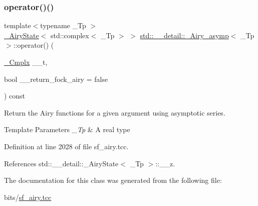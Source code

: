 \subsubsection{\texorpdfstring{operator()()}{operator()()}}
{\footnotesize\ttfamily template$<$typename \+\_\+\+Tp $>$ \\
\hyperlink{structstd_1_1____detail_1_1__AiryState}{\+\_\+\+Airy\+State}$<$ std\+::complex$<$ \+\_\+\+Tp $>$ $>$ \hyperlink{classstd_1_1____detail_1_1__Airy__asymp}{std\+::\+\_\+\+\_\+detail\+::\+\_\+\+Airy\+\_\+asymp}$<$ \+\_\+\+Tp $>$\+::operator() (\begin{DoxyParamCaption}\item[{\hyperlink{classstd_1_1____detail_1_1__Airy__asymp_ae28f102423d34e78502ab6da42d67f50}{\+\_\+\+Cmplx}}]{\+\_\+\+\_\+t,  }\item[{bool}]{\+\_\+\+\_\+return\+\_\+fock\+\_\+airy = {\ttfamily false} }\end{DoxyParamCaption}) const}

Return the Airy functions for a given argument using asymptotic series.


\begin{DoxyTemplParams}{Template Parameters}
{\em \+\_\+\+Tp} & A real type \\
\hline
\end{DoxyTemplParams}


Definition at line 2028 of file sf\+\_\+airy.\+tcc.



References std\+::\+\_\+\+\_\+detail\+::\+\_\+\+Airy\+State$<$ \+\_\+\+Tp $>$\+::\+\_\+\+\_\+z.



The documentation for this class was generated from the following file\+:\begin{DoxyCompactItemize}
\item 
bits/\hyperlink{sf__airy_8tcc}{sf\+\_\+airy.\+tcc}\end{DoxyCompactItemize}
